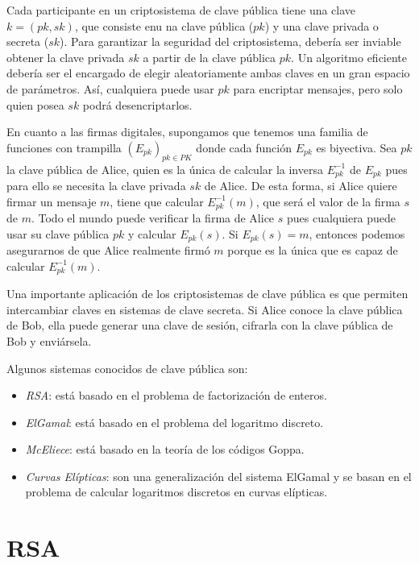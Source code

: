 Cada participante en un criptosistema de clave pública tiene una clave $k = (pk, sk)$, que consiste enu na clave pública ($pk$) y una clave privada o secreta ($sk$). Para garantizar la seguridad del criptosistema, debería ser inviable obtener la clave privada $sk$ a partir de la clave pública $pk$. Un algoritmo eficiente debería ser el encargado de elegir aleatoriamente ambas claves en un gran espacio de parámetros. Así, cualquiera puede usar $pk$ para encriptar mensajes, pero solo quien posea $sk$ podrá desencriptarlos.

En cuanto a las firmas digitales, supongamos que tenemos una familia de funciones con trampilla $\left( E_{pk} \right)_{pk \in PK}$ donde cada función $E_{pk}$ es biyectiva. Sea $pk$ la clave pública de Alice, quien es la única de calcular la inversa $E_{pk}^{-1}$ de $E_{pk}$ pues para ello se necesita la clave privada $sk$ de Alice. De esta forma, si Alice quiere firmar un mensaje $m$, tiene que calcular $E_{pk}^{-1}(m)$, que será el valor de la firma $s$ de $m$. Todo el mundo puede verificar la firma de Alice $s$ pues cualquiera puede usar su clave pública $pk$ y calcular $E_{pk}(s)$. Si $E_{pk} (s) = m$, entonces podemos asegurarnos de que Alice realmente firmó $m$ porque es la única que es capaz de calcular $E_{pk}^{-1}(m)$.

Una importante aplicación de los criptosistemas de clave pública es que permiten intercambiar claves en sistemas de clave secreta. Si Alice conoce la clave pública de Bob, ella puede generar una clave de sesión, cifrarla con la clave pública de Bob y enviársela.  

Algunos sistemas conocidos de clave pública son:

\begin{itemize}
    \item \emph{RSA}: está basado en el problema de factorización de enteros.
    \item \emph{ElGamal}: está basado en el problema del logaritmo discreto.
    \item \emph{McEliece}: está basado en la teoría de los códigos Goppa.
    \item \emph{Curvas Elípticas}: son una generalización del sistema ElGamal y se basan en el problema de calcular logaritmos discretos en curvas elípticas.
\end{itemize}

\section{RSA}

